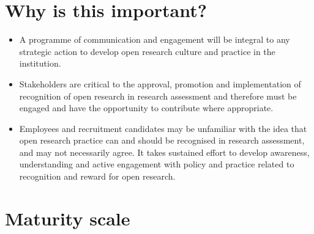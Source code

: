 \documentclass[
  letterpaper,
  DIV=11,
  numbers=noendperiod,
  oneside]{scrreprt}
\begin{document}
\section{Why is this important?}\label{why-is-this-important-3}

\begin{itemize}
\item
  A programme of communication and engagement will be integral to any
  strategic action to develop open research culture and practice in the
  institution.
\item
  Stakeholders are critical to the approval, promotion and
  implementation of recognition of open research in research assessment
  and therefore must be engaged and have the opportunity to contribute
  where appropriate.
\item
  Employees and recruitment candidates may be unfamiliar with the idea
  that open research practice can and should be recognised in research
  assessment, and may not necessarily agree. It takes sustained effort
  to develop awareness, understanding and active engagement with policy
  and practice related to recognition and reward for open research.
\end{itemize}

\section{Maturity scale}\label{maturity-scale-3}
\end{document}
